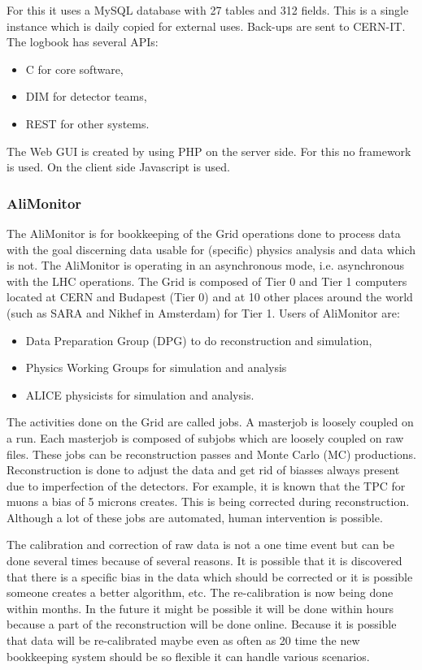 For this it uses a MySQL database with 27 tables and 312 fields. This is a single instance which is daily copied for external uses. Back-ups are sent to CERN-IT. The logbook has several APIs:
\begin{itemize}
  \item C for core software,
  \item DIM for detector teams,
  \item REST for other systems.
\end{itemize}
The Web GUI is created by using PHP on the server side. For this no framework is used. On the client side Javascript is used.


\subsubsection{AliMonitor}

The AliMonitor is for bookkeeping of the Grid operations done to process data with the goal discerning data usable for (specific) physics analysis and data which is not. The AliMonitor is operating in an asynchronous mode, i.e. asynchronous with the LHC operations. The Grid is composed of Tier 0 and Tier 1 computers located at CERN and Budapest (Tier 0) and at 10 other places around the world (such as SARA and Nikhef in Amsterdam) for Tier 1. Users of AliMonitor are:
\begin{itemize}
  \item Data Preparation Group (DPG) to do reconstruction and simulation,
  \item Physics Working Groups for simulation and analysis
  \item ALICE physicists for simulation and analysis.
\end{itemize}
The activities done on the Grid are called jobs. A masterjob is loosely coupled on a run. Each masterjob is composed of subjobs which are loosely coupled on raw files. These jobs can be reconstruction passes and Monte Carlo (MC) productions. Reconstruction is done to adjust the data and get rid of biasses always present due to imperfection of the detectors. For example, it is known that the TPC for muons a bias of 5 microns creates. This is being corrected during reconstruction. Although a lot of these jobs are automated, human intervention is possible.

The calibration and correction of raw data is not a one time event but can be done several times because of several reasons. It is possible that it is discovered that there is a specific bias in the data which should be corrected or it is possible someone creates a better algorithm, etc. The re-calibration is now being done within months. In the future it might be possible it will be done within hours because a part of the reconstruction will be done online. Because it is possible that data will be re-calibrated maybe even as often as 20 time the new bookkeeping system should be so flexible it can handle various scenarios.

